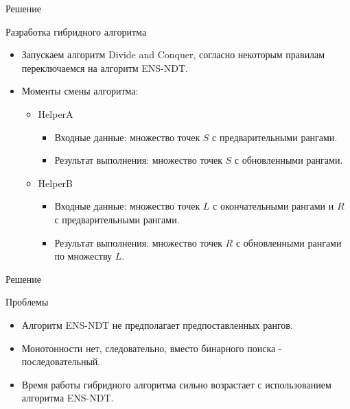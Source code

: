 \documentclass[table]{beamer}
\begin{document}
\begin{frame}{Решение}
\begin{block}{Разработка гибридного алгоритма}
  \begin{itemize}
  \item Запускаем алгоритм Divide and Conquer, согласно некоторым правилам переключаемся на алгоритм ENS-NDT.
  \item Моменты смены алгоритма:
    \begin{itemize}
    \item HelperA
      \begin{itemize}
      \item Входные данные: множество точек $S$ с предварительными рангами.
      \item Результат выполнения: множество точек $S$ с обновленными рангами.
      \end{itemize}
    \item HelperB  
      \begin{itemize}
      \item Входные данные: множество точек $L$ с окончательными рангами и $R$ с предварительными рангами.
      \item Результат выполнения: множество точек $R$ с обновленными рангами по множеству $L$.
      \end{itemize}
    \end{itemize}
  \end{itemize}
\end{block}
\end{frame}


\begin{frame}{Решение}
\begin{block}{Проблемы}
\begin{itemize}
\item Алгоритм ENS-NDT не предполагает предпоставленных рангов. 
\item Монотонности нет, следовательно, вместо бинарного поиска - последовательный.
\item Время работы гибридного алгоритма сильно возрастает с использованием алгоритма ENS-NDT.
\end{itemize}
\end{block}
\end{frame}
\end{document}
